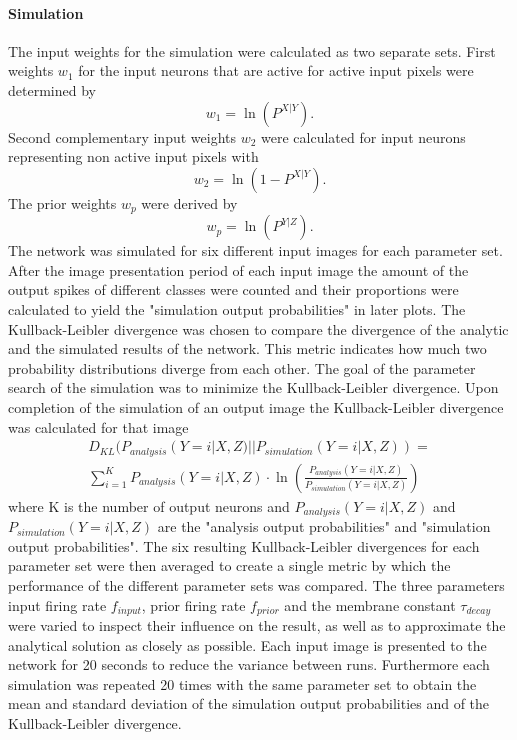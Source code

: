 \paragraph{Simulation}
The input weights for the simulation were calculated as two separate sets. First weights $w_1$ for the input neurons that are active for active input pixels were determined by 
\begin{equation}
\label{eqn:1DWeights}
w_1 = \ln(P^{X|Y}).
\end{equation}
Second complementary input weights $w_2$ were calculated for  input neurons representing non active input pixels with
\begin{equation}
\label{eqn:1DWeightsComplementary}
w_2 = \ln(1 - P^{X|Y}).
\end{equation} 
The prior weights $w_p$ were derived by 
\begin{equation}
\label{eqn:1DWeightsPrior}
w_p = \ln(P^{Y|Z}).
\end{equation}
The network was simulated for six different input images for each parameter set. After the image presentation period of each input image the amount of the output spikes of different classes were counted and their proportions were calculated to yield the "simulation output probabilities" in later plots. The Kullback-Leibler divergence was chosen to compare the divergence of the analytic and the simulated results of the network. This metric indicates how much two probability distributions diverge from each other. The goal of the parameter search of the simulation was to minimize the Kullback-Leibler divergence. Upon completion of the simulation of an output image the Kullback-Leibler divergence was calculated for that image
\begin{equation}
\begin{split}
\label{eqn:KLDivergence}
D_{KL}(P_{analysis}(Y = i|X, Z)||P_{simulation}(Y = i|X, Z)) = \\ \sum_{i=1}^K P_{analysis}(Y = i|X, Z) \cdot \ln( \frac{P_{analysis}(Y = i|X, Z)}{P_{simulation}(Y = i|X, Z)})
\end{split}
\end{equation}
where K is the number of output neurons and $P_{analysis}(Y = i|X, Z)$ and $P_{simulation}(Y = i|X, Z)$ are the "analysis output probabilities" and "simulation output probabilities". The six resulting Kullback-Leibler divergences for each parameter set were then averaged to create a single metric by which the performance of the different parameter sets was compared. The three parameters input firing rate $f_{input}$, prior firing rate $f_{prior}$ and the membrane constant $\tau_{decay}$ were varied to inspect their influence on the result, as well as to approximate the analytical solution as closely as possible. Each input image is presented to the network for 20 seconds to reduce the variance between runs. Furthermore each simulation was repeated 20 times with the same parameter set to obtain the mean and standard deviation of the simulation output probabilities and of the Kullback-Leibler divergence.

